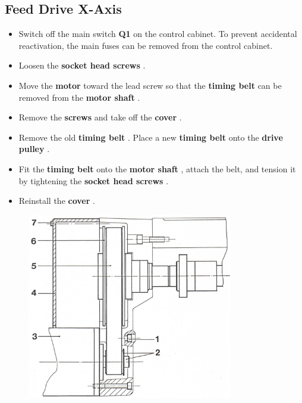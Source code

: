 


\setcounter{section}{33}

\subsection*{Feed Drive X-Axis}

\begin{itemize}
    \item Switch off the main switch \textbf{Q1} on the control cabinet.  
          To prevent accidental reactivation, the main fuses can be removed from the control cabinet.
    \item Loosen the \textbf{socket head screws }.
    \item Move the \textbf{motor } toward the lead screw so that the \textbf{timing belt } can be removed from the \textbf{motor shaft }.
    \item Remove the \textbf{screws } and take off the \textbf{cover }.
    \item Remove the old \textbf{timing belt }. Place a new \textbf{timing belt} onto the \textbf{drive pulley }.
    \item Fit the \textbf{timing belt } onto the \textbf{motor shaft }, attach the belt, and tension it by tightening the \textbf{socket head screws }.
    \item Reinstall the \textbf{cover }.
\end{itemize}

\begin{figure}[H]
    \centering
    \includegraphics[width=0.8\textwidth]{images/chapter7/timing_belt_replacement.jpg}
    \label{fig:timing_belt_replacement}
\end{figure}

